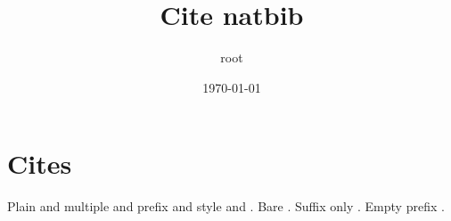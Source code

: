 \documentclass[11pt]{article}
\author{root}
\date{\today}
\title{Cite natbib}
\begin{document}
\maketitle
\tableofcontents

\section{Cites}
\label{sec:orgd2bc2e6}
Plain \citep{doe99} and multiple \citep{doe99,roe05} and prefix \citep[see][p. 3]{doe99} and style \citet{doe99} and \nocite{roe05}.
Bare \citeauthor*{doe99}. Suffix only \citep[, pp. 1-2]{doe99}. Empty prefix \citep{doe99,roe05}.


\end{document}
